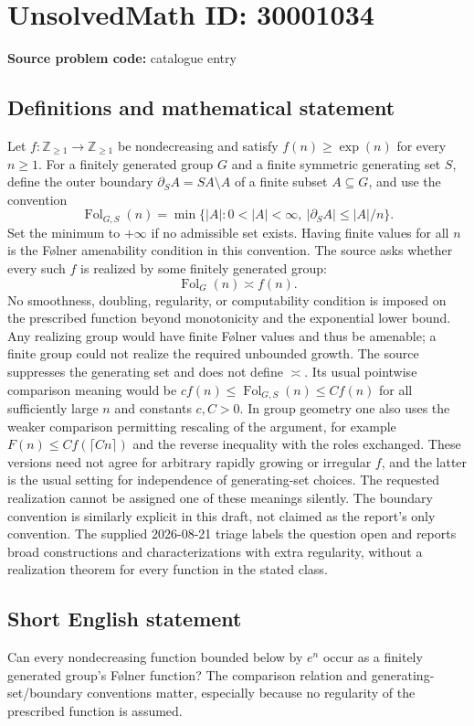 \documentclass[11pt]{article}
\newcommand{\Z}{\mathbb{Z}}
\begin{document}
\section*{UnsolvedMath ID: 30001034}
\textbf{Source problem code:} catalogue entry
\subsection{Definitions and mathematical statement}
Let $f:\Z_{\geq1}\to\Z_{\geq1}$ be nondecreasing and satisfy $f(n)\geq\exp(n)$ for every $n\geq1$. For a finitely generated group $G$ and a finite symmetric generating set $S$, define the outer boundary $\partial_S A=SA\setminus A$ of a finite subset $A\subseteq G$, and use the convention \[\operatorname{Fol}_{G,S}(n)=\min\{|A|:0<|A|<\infty,\ |\partial_S A|\leq |A|/n\}.\] Set the minimum to $+\infty$ if no admissible set exists. Having finite values for all $n$ is the F\o lner amenability condition in this convention. The source asks whether every such $f$ is realized by some finitely generated group: \[\operatorname{Fol}_G(n)\asymp f(n).\] No smoothness, doubling, regularity, or computability condition is imposed on the prescribed function beyond monotonicity and the exponential lower bound. Any realizing group would have finite F\o lner values and thus be amenable; a finite group could not realize the required unbounded growth. The source suppresses the generating set and does not define $\asymp$. Its usual pointwise comparison meaning would be $cf(n)\leq\operatorname{Fol}_{G,S}(n)\leq Cf(n)$ for all sufficiently large $n$ and constants $c,C>0$. In group geometry one also uses the weaker comparison permitting rescaling of the argument, for example $F(n)\leq C f(\lceil Cn\rceil)$ and the reverse inequality with the roles exchanged. These versions need not agree for arbitrary rapidly growing or irregular $f$, and the latter is the usual setting for independence of generating-set choices. The requested realization cannot be assigned one of these meanings silently. The boundary convention is similarly explicit in this draft, not claimed as the report's only convention. The supplied 2026-08-21 triage labels the question open and reports broad constructions and characterizations with extra regularity, without a realization theorem for every function in the stated class.
\subsection{Short English statement}
Can every nondecreasing function bounded below by $e^n$ occur as a finitely generated group's F\o lner function? The comparison relation and generating-set/boundary conventions matter, especially because no regularity of the prescribed function is assumed.
\end{document}
